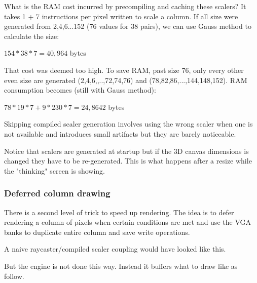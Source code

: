 \par
What is the RAM cost incurred by precompiling and caching these scalers? It takes 1 + 7 instructions per pixel written to scale a column. If all size were generated from 2,4,6...152 (76 values for 38 pairs), we can use Gauss method to calculate the size:\\
\par
$154*38*7=40,964$ bytes\\
\par
That cost was deemed too high. To save RAM, past size 76, only every other even size are generated (2,4,6,,..,72,74,76) and (78,82,86,...,144,148,152). RAM consumption becomes (still with Gauss method):\\
\par
$78*19*7+9*230*7=24,8642$ bytes\\
\par
Skipping compiled scaler generation involves using the wrong scaler when one is not available and introduces small artifacts but they are barely noticeable.\\
\par
Notice that scalers are generated at startup but if the 3D canvas dimensions is changed they have to be re-generated. This is what happens after a resize while the "thinking" screen is showing.
\begin{figure}[H]
 \centering
\end{figure}







\subsubsection{Deferred column drawing}
There is a second level of trick to speed up rendering. The idea is to defer rendering a column of pixels when certain conditions are met and use the VGA banks to duplicate entire column and save write operations.\\
\par 
A naive raycaster/compiled scaler coupling would have looked like this.\\

\begin{minipage}{\textwidth}

\end{minipage}
\par
But the engine is not done this way. Instead it buffers what to draw like as follow.\\
\par
\begin{minipage}{\textwidth}

\end{minipage}

